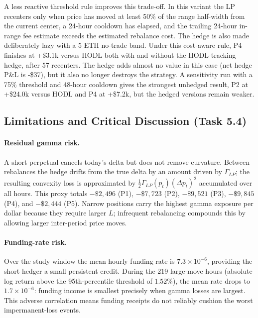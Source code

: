 A less reactive threshold rule improves this trade-off. In this variant the LP
recenters only when price has moved at least 50\% of the range half-width from
the current center, a 24-hour cooldown has elapsed, and the trailing 24-hour
in-range fee estimate exceeds the estimated rebalance cost. The hedge is also
made deliberately lazy with a 5 ETH no-trade band. Under this cost-aware rule,
P4 finishes at +\$3.1k versus HODL both with and without the HODL-tracking hedge,
after 57 recenters. The hedge adds almost no value in this case (net hedge P\&L
is -\$37), but it also no longer destroys the strategy. A sensitivity run with a
75\% threshold and 48-hour cooldown gives the strongest unhedged result, P2 at
+\$24.0k versus HODL and P4 at +\$7.2k, but the hedged versions remain weaker.

\subsection{Limitations and Critical Discussion (Task 5.4)}
\label{sec:module5-limitations}

\paragraph{Residual gamma risk.}
A short perpetual cancels today's delta but does not remove curvature. Between rebalances the
hedge drifts from the true delta by an amount driven by $\Gamma_{LP}$; the resulting convexity
loss is approximated by $\frac{1}{2}\Gamma_{LP}(p_t)(\Delta p_t)^2$ accumulated over all hours.
This proxy totals $-\$2{,}496$ (P1), $-\$7{,}723$ (P2), $-\$9{,}521$ (P3), $-\$9{,}845$ (P4),
and $-\$2{,}444$ (P5). Narrow positions carry the highest gamma exposure per dollar because they
require larger $L$; infrequent rebalancing compounds this by allowing larger inter-period price
moves.

\paragraph{Funding-rate risk.}
Over the study window the mean hourly funding rate is $7.3\times10^{-6}$, providing the short
hedger a small persistent credit. During the 219 large-move hours (absolute log return above the
95th-percentile threshold of $1.52\%$), the mean rate drops to $1.7\times10^{-6}$: funding
income is smallest precisely when gamma losses are largest. This adverse correlation means
funding receipts do not reliably cushion the worst impermanent-loss events.


